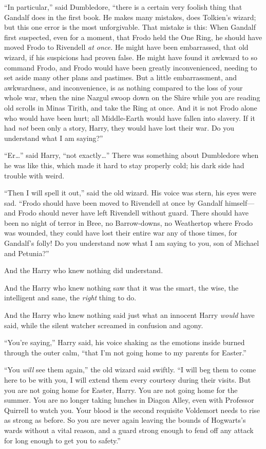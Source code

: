 ``In particular,'' said Dumbledore, ``there is a certain very foolish
thing that Gandalf does in the first book. He makes many mistakes, does
Tolkien's wizard; but this one error is the most unforgivable. That
mistake is this: When Gandalf first suspected, even for a moment, that
Frodo held the One Ring, he should have moved Frodo to Rivendell
\emph{at once.} He might have been embarrassed, that old wizard, if his
suspicions had proven false. He might have found it awkward to so
command Frodo, and Frodo would have been greatly inconvenienced, needing
to set aside many other plans and pastimes. But a little embarrassment,
and awkwardness, and inconvenience, is as nothing compared to the loss
of your whole war, when the nine Nazgul swoop down on the Shire while
you are reading old scrolls in Minas Tirith, and take the Ring at once.
And it is not Frodo alone who would have been hurt; all Middle-Earth
would have fallen into slavery. If it had \emph{not} been only a story,
Harry, they would have lost their war. Do you understand what I am
saying?''

``Er\ldots{}'' said Harry, ``not exactly\ldots{}'' There was something
about Dumbledore when he was like this, which made it hard to stay
properly cold; his dark side had trouble with weird.

``Then I will spell it out,'' said the old wizard. His voice was stern,
his eyes were sad. ``Frodo should have been moved to Rivendell at once
by Gandalf himself---and Frodo should never have left Rivendell without
guard. There should have been no night of terror in Bree, no
Barrow-downs, no Weathertop where Frodo was wounded, they could have
lost their entire war any of those times, for Gandalf's folly! Do you
understand now what I am saying to you, son of Michael and Petunia?''

And the Harry who knew nothing did understand.

And the Harry who knew nothing saw that it was the smart, the wise, the
intelligent and sane, the \emph{right} thing to do.

And the Harry who knew nothing said just what an innocent Harry
\emph{would} have said, while the silent watcher screamed in confusion
and agony.

``You're saying,'' Harry said, his voice shaking as the emotions inside
burned through the outer calm, ``that I'm not going home to my parents
for Easter.''

``You \emph{will} see them again,'' the old wizard said swiftly. ``I
will beg them to come here to be with you, I will extend them every
courtesy during their visits. But you are not going home for Easter,
Harry. You are not going home for the summer. You are no longer taking
lunches in Diagon Alley, even with Professor Quirrell to watch you. Your
blood is the second requisite Voldemort needs to rise as strong as
before. So you are never again leaving the bounds of Hogwarts's wards
without a vital reason, and a guard strong enough to fend off any attack
for long enough to get you to safety.''

